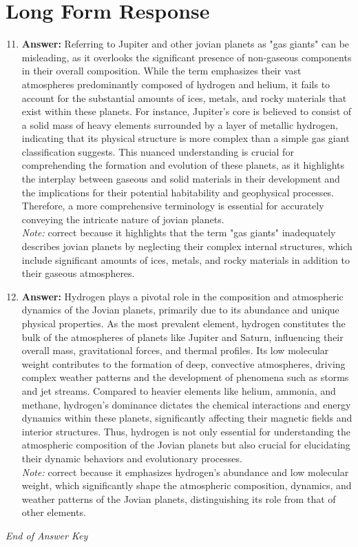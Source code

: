 \documentclass[12pt]{article}
\begin{document}
\section*{Long Form Response}
\begin{enumerate}[label=\arabic*.]
\setcounter{enumi}{10}
\item \textbf{Answer:} Referring to Jupiter and other jovian planets as "gas giants" can be misleading, as it overlooks the significant presence of non-gaseous components in their overall composition. While the term emphasizes their vast atmospheres predominantly composed of hydrogen and helium, it fails to account for the substantial amounts of ices, metals, and rocky materials that exist within these planets. For instance, Jupiter's core is believed to consist of a solid mass of heavy elements surrounded by a layer of metallic hydrogen, indicating that its physical structure is more complex than a simple gas giant classification suggests. This nuanced understanding is crucial for comprehending the formation and evolution of these planets, as it highlights the interplay between gaseous and solid materials in their development and the implications for their potential habitability and geophysical processes. Therefore, a more comprehensive terminology is essential for accurately conveying the intricate nature of jovian planets.
\\ \textit{Note:} correct because it highlights that the term "gas giants" inadequately describes jovian planets by neglecting their complex internal structures, which include significant amounts of ices, metals, and rocky materials in addition to their gaseous atmospheres.
\item \textbf{Answer:} Hydrogen plays a pivotal role in the composition and atmospheric dynamics of the Jovian planets, primarily due to its abundance and unique physical properties. As the most prevalent element, hydrogen constitutes the bulk of the atmospheres of planets like Jupiter and Saturn, influencing their overall mass, gravitational forces, and thermal profiles. Its low molecular weight contributes to the formation of deep, convective atmospheres, driving complex weather patterns and the development of phenomena such as storms and jet streams. Compared to heavier elements like helium, ammonia, and methane, hydrogen's dominance dictates the chemical interactions and energy dynamics within these planets, significantly affecting their magnetic fields and interior structures. Thus, hydrogen is not only essential for understanding the atmospheric composition of the Jovian planets but also crucial for elucidating their dynamic behaviors and evolutionary processes.
\\ \textit{Note:} correct because it emphasizes hydrogen's abundance and low molecular weight, which significantly shape the atmospheric composition, dynamics, and weather patterns of the Jovian planets, distinguishing its role from that of other elements.
\end{enumerate}

\vfill
\noindent\textit{End of Answer Key}
\end{document}
